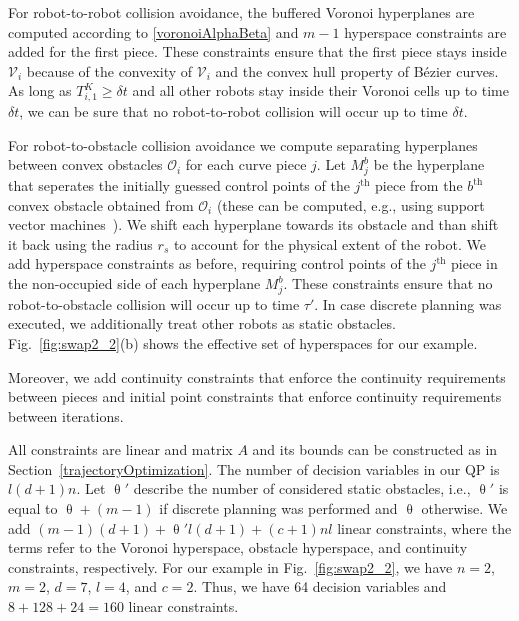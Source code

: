 \documentclass{svproc}
\newcommand{\vP}{\mathbf{P}}
\newcommand{\cV}{\mathcal{V}}
\newcommand{\cO}{\mathcal{O}}
\renewcommand{\th}{^{\text{th}}}
\begin{document}
For robot-to-robot collision avoidance, the buffered Voronoi hyperplanes are computed according to \eqref{voronoiAlphaBeta} and $m-1$ hyperspace constraints are added for the first piece.
These constraints ensure that the first piece stays inside $\cV_i$ because of the convexity of $\cV_i$ and the convex hull property of B\'ezier curves.
As long as $T^{K}_{i,1} \geq \delta t$ and all other robots stay inside their Voronoi cells up to time $\delta t$, we can be sure that no robot-to-robot collision will occur up to time $\delta t$.

For robot-to-obstacle collision avoidance we compute separating hyperplanes between convex obstacles $\cO_i$ for each curve piece $j$.
Let $M_j^b$ be the hyperplane that seperates the initially guessed control points of the $j\th$ piece from the $b\th$ convex obstacle obtained from $\cO_i$ (these can be computed, e.g., using support vector machines~\cite{SVM}).
We shift each hyperplane towards its obstacle and than shift it back using the radius $r_s$ to account for the physical extent of the robot.
We add hyperspace constraints as before, requiring control points of the $j\th$ piece in the non-occupied side of each hyperplane $M_j^b$.
These constraints ensure that no robot-to-obstacle collision will occur up to time $\tau'$.
In case discrete planning was executed, we additionally treat other robots as static obstacles.
Fig.~\ref{fig:swap2_2}(b) shows the effective set of hyperspaces for our example.

Moreover, we add continuity constraints that enforce the continuity requirements between pieces and initial point constraints that enforce continuity requirements between iterations.

All constraints are linear and matrix $A$ and its bounds can be constructed as in Section~\ref{trajectoryOptimization}.
The number of decision variables in our QP is $l(d+1)n$.
Let $\uptheta'$ describe the number of considered static obstacles, i.e., $\uptheta'$ is equal to $\uptheta + (m-1)$ if discrete planning was performed and $\uptheta$ otherwise.
We add $(m-1)(d+1) + \uptheta' l(d+1) + (c+1)nl$ linear constraints, where the terms refer to the Voronoi hyperspace, obstacle hyperspace, and continuity constraints, respectively.
For our example in Fig.~\ref{fig:swap2_2}, we have $n=2$, $m=2$, $d=7$, $l=4$, and $c=2$. Thus, we have 64 decision variables and $8 + 128 + 24 = 160$ linear constraints.
\end{document}
